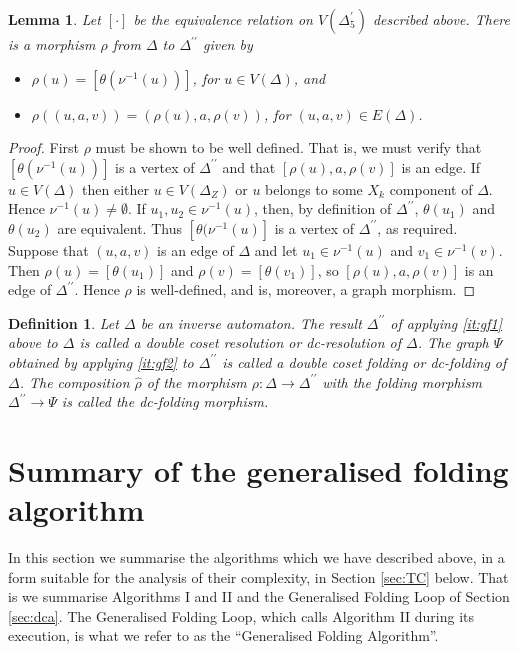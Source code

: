 \documentclass[a4paper,12pt]{article}
\newcommand{\D}{\Delta }
\renewcommand{\S}{\Sigma }
\newcommand{\nul}{\emptyset }
\newtheorem{lemma}[theorem]{Lemma}
\newtheorem{definition}[theorem]{Definition}
\numberwithin{equation}{section}
\numberwithin{figure}{section}
\newcommand{\maps}{\rightarrow}
\begin{document}
\begin{lemma}\label{lem:resol-quot}
Let $[\cdot]$ be the equivalence relation on $V(\D^\prime_5)$
described above. There is a morphism $\rho$ from  $\D$ to
$\D^{\prime\prime}$ given by
\begin{itemize}
\item
$\rho(u)=[\theta(\nu^{-1}(u))]$, for
$u\in V(\D)$, and
\item
$\rho((u,a,v))=(\rho(u),a,\rho(v))$, for $(u,a,v)\in  E(\D)$.
\end{itemize}
\end{lemma}
\begin{proof}
First $\rho$ must be shown to be well defined.
That is, we must verify that $[\theta(\nu^{-1}(u))]$ is a vertex of
$\D^{\prime\prime}$ and that $[\rho(u),a,\rho(v)]$ is an edge.
If $u \in V(\D)$
then either $u\in V(\D_Z)$ or  $u$ belongs to
some $X_k$ component of $\D$. Hence
 $\nu^{-1}(u)\neq \nul$. If $u_1, u_2\in \nu^{-1}(u)$, then,
by definition of
$\D^{\prime\prime}$, $\theta(u_1)$ and $\theta(u_2)$ are equivalent.
Thus $[\theta(\nu^{-1}(u)]$ is a vertex of $\D^{\prime\prime}$,
as required.
 Suppose that $(u,a,v)$ is an edge
of $\D$ and let $u_1\in \nu^{-1}(u)$ and $v_1\in \nu^{-1}(v)$. Then
$\rho(u)=[\theta(u_1)]$ and $\rho(v)=[\theta(v_1)]$, so
$[\rho(u), a, \rho(v)]$ is an edge of $\D^{\prime\prime}$.
Hence $\rho$ is well-defined, and is, moreover, a graph morphism.
\end{proof}


\begin{definition}
Let $\D$ be an inverse automaton.
 The result $\D^{\prime\prime}$ of applying  \ref{it:gf1}
above to $\D$ is called a \emph{double coset resolution} or
\emph{dc-resolution} of $\D$. The graph $\Psi$ obtained by applying
 \ref{it:gf2} to $\D^{\prime\prime}$ is called a \emph{double
coset folding} or \emph{dc-folding} of $\D$.  The composition $\hat\rho$ of
the  morphism
$\rho:\D\maps \D^{\prime\prime}$ with the folding morphism $\D^{\prime\prime}\maps
\Psi$ is called the \emph{dc-folding morphism}.
\end{definition}
\section{Summary of the generalised folding algorithm}
In this section we summarise the algorithms which we have described above,
in a form suitable for the analysis of their complexity,
in Section \ref{sec:TC} below. That is we summarise Algorithms I and II
and the Generalised Folding Loop of Section \ref{sec:dca}. The Generalised Folding Loop, which calls Algorithm II
during its execution, is what we refer to as the ``Generalised Folding
Algorithm''.
\end{document}
